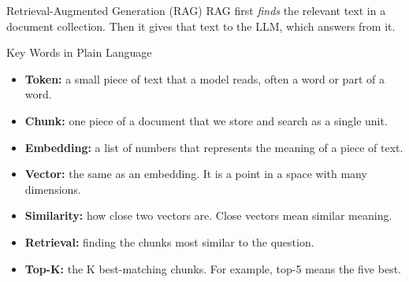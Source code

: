 \documentclass[aspectratio=169,10pt]{beamer}
\begin{document}
\begin{frame}[t]{Retrieval-Augmented Generation (RAG)}
\small
RAG first \emph{finds} the relevant text in a document collection. Then it gives that text to the LLM, which answers from it.
\vspace{14pt}
\begin{center}
\end{center}
\end{frame}

\begin{frame}[t]{Key Words in Plain Language}
\small
\begin{itemize}
  \item \textbf{Token:} a small piece of text that a model reads, often a word or part of a word.
  \item \textbf{Chunk:} one piece of a document that we store and search as a single unit.
  \item \textbf{Embedding:} a list of numbers that represents the meaning of a piece of text.
  \item \textbf{Vector:} the same as an embedding. It is a point in a space with many dimensions.
  \item \textbf{Similarity:} how close two vectors are. Close vectors mean similar meaning.
  \item \textbf{Retrieval:} finding the chunks most similar to the question.
  \item \textbf{Top-K:} the K best-matching chunks. For example, top-5 means the five best.
\end{itemize}
\end{frame}
\end{document}
